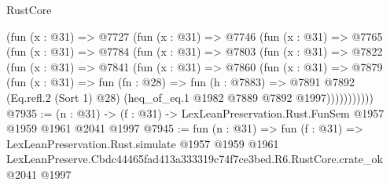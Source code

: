 \begin{lexlean}{RustCore}
\begin{coremodule}
    (fun (x : @31) =>
    @7727
      (fun (x : @31) =>
      @7746
        (fun (x : @31) =>
        @7765
          (fun (x : @31) =>
          @7784
            (fun (x : @31) =>
            @7803
              (fun (x : @31) =>
              @7822
                (fun (x : @31) =>
                @7841
                  (fun (x : @31) =>
                  @7860
                    (fun (x : @31) =>
                    @7879
                      (fun (x : @31) =>
                      fun (fn : @28) =>
                      fun (h : @7883) =>
                      @7891
                        @7892
                        (Eq.refl.{2} (Sort 1) @28)
                        (heq_of_eq.{1} @1982 @7889 @7892 @1997)))))))))))
@7935 := (n : @31) -> (f : @31) -> LexLeanPreservation.Rust.FunSem @1957 @1959 @1961 @2041 @1997
@7945 := fun (n : @31) =>
  fun (f : @31) =>
  LexLeanPreservation.Rust.simulate
    @1957
    @1959
    @1961
    LexLeanPreserve.Cbdc44465fad413a333319c74f7ce3bed.R6.RustCore.crate_ok
    @2041
    @1997
\end{coremodule}
\end{lexlean}
